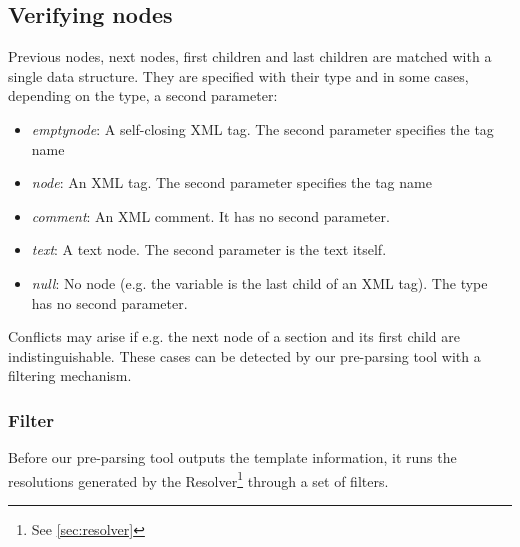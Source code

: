 \documentclass[thesis.tex]{subfiles}
\begin{document}
\subsection{Verifying nodes}
Previous nodes, next nodes, first children and last children are matched with
a single data structure.
They are specified with their type and in some cases, depending on the type,
a second parameter:
\begin{itemize}
\item \emph{emptynode}: A self-closing XML tag. The second parameter specifies
                        the tag name
\item \emph{node}:      An XML tag. The second parameter specifies
                        the tag name
\item \emph{comment}:   An XML comment. It has no second parameter.
\item \emph{text}:      A text node. The second parameter is the text itself.
\item \emph{null}:      No node (e.g. the variable is the
                        last child of an XML tag). The type has no second
                        parameter.
\end{itemize}

Conflicts may arise if e.g. the next node of a section and its first child are
indistinguishable. These cases can be detected by our pre-parsing tool with a
filtering mechanism.

\subsubsection{Filter}
\label{sec:filter}
Before our pre-parsing tool outputs the template information, it runs the
resolutions generated by the Resolver\footnote{See \ref{sec:resolver}}
through a set of filters.
\end{document}
